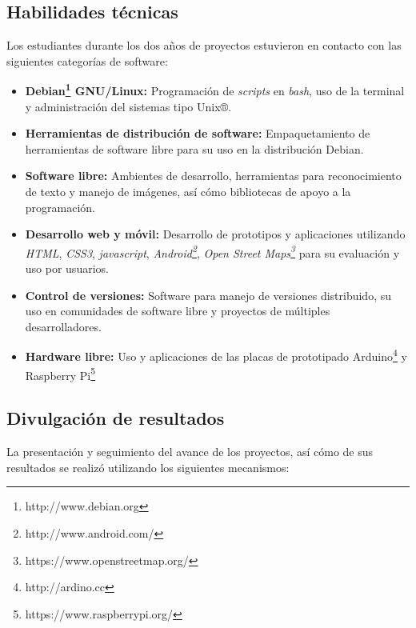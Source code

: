 \documentclass[conference]{IEEEtran}
\begin{document}
\subsection*{Habilidades técnicas}

Los estudiantes durante los dos años de proyectos estuvieron en contacto con las
siguientes categorías de software:

\begin{itemize}
    \item \textbf{Debian\footnote{http://www.debian.org} GNU/Linux:}
        Programación de \textit{scripts} en \textit{bash}, uso de la terminal y
        administración del sistemas tipo Unix®.

    \item \textbf{Herramientas de distribución de software:} Empaquetamiento de
        herramientas de software libre para su uso en la distribución Debian.

    \item \textbf{Software libre:} Ambientes de desarrollo, herramientas para
        reconocimiento de texto y manejo de imágenes, así cómo bibliotecas de
        apoyo a la programación.

    \item \textbf{Desarrollo web y móvil:} Desarrollo de prototipos y
        aplicaciones utilizando \textit{HTML}, \textit{CSS3},
        \textit{javascript}, \textit{Android\footnote{http://www.android.com/}},
        \textit{Open Street Maps\footnote{https://www.openstreetmap.org/}} para
        su evaluación y uso por usuarios.

    \item \textbf{Control de versiones:} Software para manejo de versiones
        distribuido, su uso en comunidades de software libre y proyectos de
        múltiples desarrolladores.

    \item \textbf{Hardware libre:} Uso y aplicaciones de las placas de
        prototipado Arduino\footnote{http://ardino.cc} y Raspberry
        Pi\footnote{https://www.raspberrypi.org/}

\end{itemize}

\subsection*{ Divulgación de resultados}

La presentación y seguimiento del avance de los proyectos, así cómo de sus
resultados se realizó utilizando los siguientes mecanismos:
\end{document}
